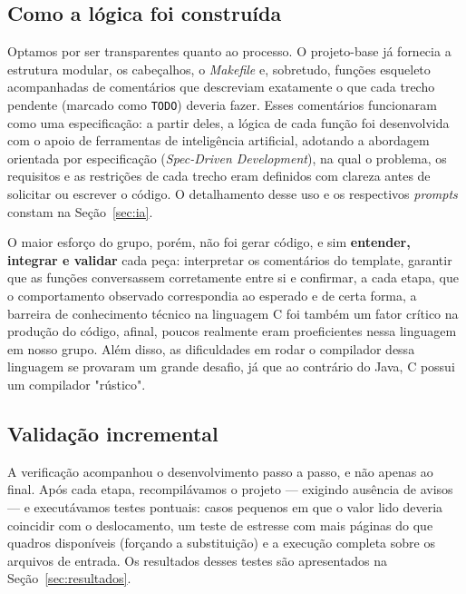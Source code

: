 \documentclass[11pt,a4paper]{article}
\begin{document}
\subsection{Como a lógica foi construída}
Optamos por ser transparentes quanto ao processo. O projeto-base já fornecia a
estrutura modular, os cabeçalhos, o \textit{Makefile} e, sobretudo, funções
esqueleto acompanhadas de comentários que descreviam exatamente o que cada
trecho pendente (marcado como \texttt{TODO}) deveria fazer. Esses comentários
funcionaram como uma especificação: a partir deles, a lógica de cada função foi
desenvolvida com o apoio de ferramentas de inteligência artificial, adotando a
abordagem orientada por especificação (\textit{Spec-Driven Development}), na qual
o problema, os requisitos e as restrições de cada trecho eram definidos com
clareza antes de solicitar ou escrever o código. O detalhamento desse uso e os
respectivos \textit{prompts} constam na Seção~\ref{sec:ia}.

O maior esforço do grupo, porém, não foi gerar código, e sim \textbf{entender,
integrar e validar} cada peça: interpretar os comentários do template, garantir
que as funções conversassem corretamente entre si e confirmar, a cada etapa, que
o comportamento observado correspondia ao esperado e de certa forma, a barreira de 
conhecimento técnico na linguagem C foi também um fator crítico na produção do código, 
afinal, poucos realmente eram proeficientes nessa linguagem em nosso grupo. Além disso, 
as dificuldades em rodar o compilador dessa linguagem se provaram um grande desafio, já
que ao contrário do Java, C possui um compilador "rústico".

\subsection{Validação incremental}
A verificação acompanhou o desenvolvimento passo a passo, e não apenas ao final.
Após cada etapa, recompilávamos o projeto --- exigindo ausência de avisos --- e
executávamos testes pontuais: casos pequenos em que o valor lido deveria
coincidir com o deslocamento, um teste de estresse com mais páginas do que
quadros disponíveis (forçando a substituição) e a execução completa sobre os
arquivos de entrada. Os resultados desses testes são apresentados na
Seção~\ref{sec:resultados}.
\end{document}
